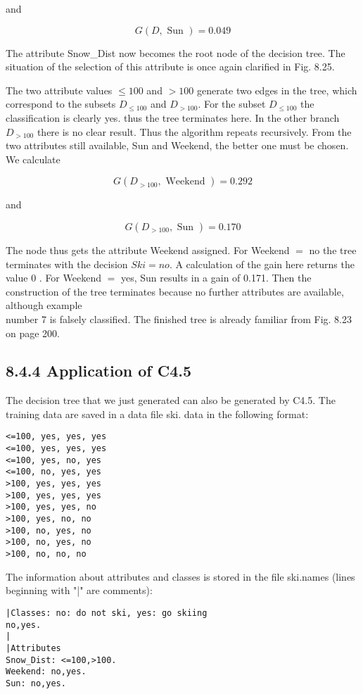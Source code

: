 \documentclass[10pt]{article}
\begin{document}
and

$$
G(D, \text { Sun })=0.049
$$

The attribute Snow\_Dist now becomes the root node of the decision tree. The situation of the selection of this attribute is once again clarified in Fig. 8.25.

The two attribute values $\leq 100$ and $>100$ generate two edges in the tree, which correspond to the subsets $D_{\leq 100}$ and $D_{>100}$. For the subset $D_{\leq 100}$ the classification is clearly yes. thus the tree terminates here. In the other branch $D_{>100}$ there is no clear result. Thus the algorithm repeats recursively. From the two attributes still available, Sun and Weekend, the better one must be chosen. We calculate

$$
G\left(D_{>100}, \text { Weekend }\right)=0.292
$$

and

$$
G\left(D_{>100}, \text { Sun }\right)=0.170
$$

The node thus gets the attribute Weekend assigned. For Weekend $=$ no the tree terminates with the decision $S k i=n o$. A calculation of the gain here returns the value 0 . For Weekend $=$ yes, Sun results in a gain of 0.171. Then the construction of the tree terminates because no further attributes are available, although example\\
number 7 is falsely classified. The finished tree is already familiar from Fig. 8.23 on page 200.

\subsection*{8.4.4 Application of C4.5}
The decision tree that we just generated can also be generated by C4.5. The training data are saved in a data file ski. data in the following format:

\begin{verbatim}
<=100, yes, yes, yes
<=100, yes, yes, yes
<=100, yes, no, yes
<=100, no, yes, yes
>100, yes, yes, yes
>100, yes, yes, yes
>100, yes, yes, no
>100, yes, no, no
>100, no, yes, no
>100, no, yes, no
>100, no, no, no
\end{verbatim}

The information about attributes and classes is stored in the file ski.names (lines beginning with "|" are comments):

\begin{verbatim}
|Classes: no: do not ski, yes: go skiing
no,yes.
|
|Attributes
Snow_Dist: <=100,>100.
Weekend: no,yes.
Sun: no,yes.
\end{verbatim}
\end{document}
